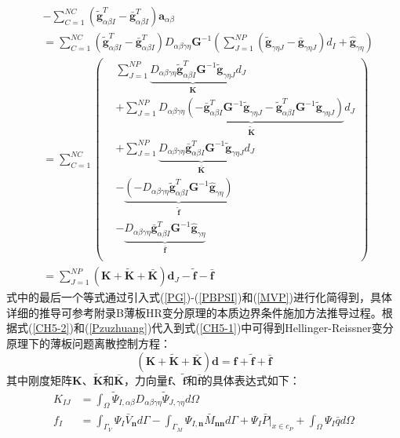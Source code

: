 \begin{equation}
\begin{split}\label{Pzuzhuang}
    &-\sum_{C=1}^{N\!C}(\tilde{\pmb g}_{\alpha\beta I}^T-\bar{\pmb g}_{\alpha\beta I}^T)\pmb a_{\alpha\beta}\\
    &=\sum_{C=1}^{N\!C}(\tilde{\pmb g}_{\alpha\beta I}^T-\bar{\pmb g}_{\alpha\beta I}^T)D_{\alpha\beta\gamma\eta}\pmb{G}^{-1}(\sum_{J=1}^{N\!P}(\tilde{\pmb g}_{\gamma\eta J}-\bar{\pmb g}_{\gamma\eta J})d_I+\hat{\pmb g}_{\gamma\eta})\\
    &=\sum_{C=1}^{N\!C}
    \left(\begin{split}
    &\sum_{J=1}^{N\!P}\underbrace{D_{\alpha\beta\gamma\eta}\tilde{\pmb g}_{\alpha\beta I}^T\pmb G^{-1}\tilde{\pmb g}_{\gamma\eta J}}_{\pmb{K}}d_J\\
    &+\sum_{J=1}^{N\!P}\underbrace{D_{\alpha\beta\gamma\eta}(-\bar{\pmb g}_{\alpha\beta I}^T\pmb G^{-1}\tilde{\pmb g}_{\gamma\eta J}-\tilde{\pmb g}_{\alpha\beta I}^T\pmb G^{-1}\tilde{\pmb g}_{\gamma\eta J})}_{\tilde{\pmb K}}d_J\\
    &+\sum_{J=1}^{N\!P}\underbrace{D_{\alpha\beta\gamma\eta}\bar{\pmb g}_{\alpha\beta I}^T\pmb G^{-1}\tilde{\pmb g}_{\gamma\eta J}}_{\bar{\pmb K}}d_J\\
    &-\underbrace{(-D_{\alpha\beta\gamma\eta}\tilde{\pmb g}_{\alpha\beta I}^T\pmb G^{-1}\hat{\pmb g}_{\gamma\eta })}_{\tilde{\pmb f}}\\
    &-\underbrace{D_{\alpha\beta\gamma\eta}\bar{\pmb g}_{\alpha\beta I}^T\pmb G^{-1}\hat{\pmb g}_{\gamma\eta }}_{\bar{\pmb f}}\\
    \end{split}\right)\\
    &=\sum_{J=1}^{N\!P}(\pmb{K}+\tilde{\pmb{K}}+\bar{\pmb{K}})\pmb d_J-\tilde{\pmb f}-\bar{\pmb f}
\end{split}
\end{equation}
式中的最后一个等式通过引入式(\ref{PG})-(\ref{PBPSI})和(\ref{MVP})进行化简得到，具体详细的推导可参考附录B薄板HR变分原理的本质边界条件施加方法推导过程。根据式(\ref{CH5-2})和(\ref{Pzuzhuang})代入到式(\ref{CH5-1})中可得到Hellinger-Reissner变分原理下的薄板问题离散控制方程：
\begin{equation}\label{equationP}
    (\pmb{K}+\tilde{\pmb K}+\bar{\pmb K})\pmb{d}=\pmb{f}+\tilde{\pmb f}+\bar{\pmb f}
\end{equation}
其中刚度矩阵$\pmb K$、$\tilde{\pmb K}$和$\bar{\pmb K}$，力向量$\pmb f$、$\tilde{\pmb f}$和$\bar{\pmb f}$的具体表达式如下：
\begin{subequations}\label{PHR1}
\begin{align}
K_{IJ}&=\int_{\Omega}\tilde{\Psi}_{I,\alpha\beta}D_{\alpha\beta\gamma\eta}\tilde{\Psi}_{J,\gamma\eta}d\Omega \\
f_I&=\int_{\Gamma_V}\Psi_I\bar{V}_{\pmb{n}}d\Gamma-\int_{\Gamma_M}\Psi_{I,\pmb{n}}\bar{M}_{\pmb{nn}}d\Gamma+\Psi_I\bar{P}\vert_{x\in c_P}+\int_{\Omega}\Psi_I\bar{q}d\Omega
\end{align}
\end{subequations}

